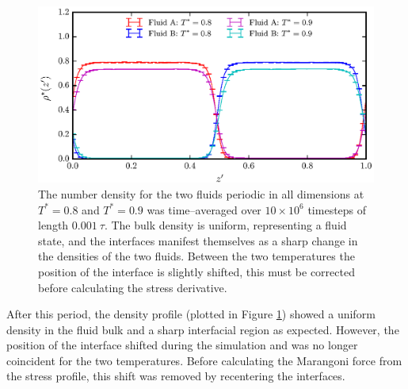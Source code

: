 \begin{figure}[h]
\centering
\includegraphics[scale=1.0]{Period10Rho}
\caption{The number density for the two fluids periodic in all dimensions at $T^{*} = 0.8$ and $T^{*} = 0.9$ was time--averaged over $10 \times 10^{6}$ timesteps of length $0.001\ \tau$. 
The bulk density is uniform, representing a fluid state, and the interfaces manifest themselves as a sharp change in the densities of the two fluids.
Between the two temperatures the position of the interface is slightly shifted, this must be corrected before calculating the stress derivative.
}
\label{Period10Rho}
\end{figure}
After this period, the density profile (plotted in Figure \ref{Period10Rho}) showed a uniform density in the fluid bulk and a sharp interfacial region as expected.
However, the position of the interface shifted during the simulation and was no longer coincident for the two temperatures.
Before calculating the Marangoni force from the stress profile, this shift was removed by recentering the interfaces.
\FloatBarrier

